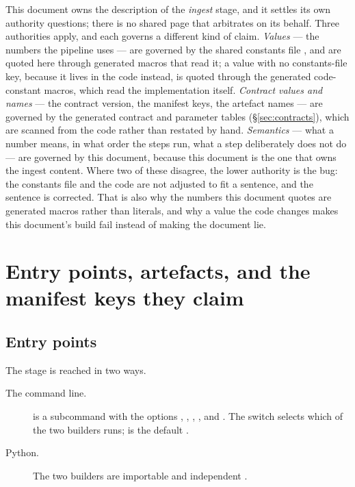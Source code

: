 \documentclass[11pt,a4paper]{article} \usepackage[utf8]{inputenc} \usepackage{lmodern} \usepackage[T1]{fontenc}
\begin{document}
This document owns the description of the \emph{ingest} stage, and it settles its own authority
questions; there is no shared page that arbitrates on its behalf. Three authorities apply, and
each governs a different kind of claim. \emph{Values} --- the numbers the pipeline uses --- are
governed by the shared constants file , and are
quoted here through generated macros that read it; a value with no constants-file key, because it lives in the code
instead, is quoted through the generated code-constant macros, which read the implementation
itself. \emph{Contract values and names} --- the contract version, the manifest keys, the
artefact names --- are governed by the generated contract and parameter tables
(\S\ref{sec:contracts}), which are scanned from the code rather than restated by hand.
\emph{Semantics} --- what a number means, in what order the steps run, what a step deliberately
does not do --- are governed by this document, because this document is the one that owns the
ingest content. Where two of these disagree, the lower authority is the bug: the constants file
and the code are not adjusted to fit a sentence, and the sentence is corrected. That is also why
the numbers this document quotes are generated macros rather than literals, and why a value the
code changes makes this document's build fail instead of making the document lie.

\section{Entry points, artefacts, and the manifest keys they claim} \label{sec:entry}

\subsection{Entry points}

The stage is reached in two ways.

\begin{description}
\item[The command line.]  is a subcommand with the options ,
, , ,  and 
. The switch  selects which of the
two builders runs;  is the default .
\item[Python.] The two builders are importable and independent
.
\end{description}
\end{document}
